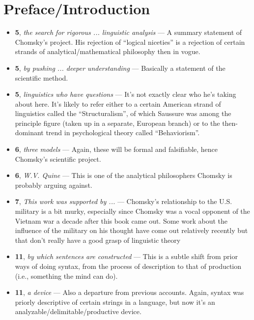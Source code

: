 \documentclass[12pt]{article}
\begin{document}
\section{Preface/Introduction}

\begin{itemize}

\item \textbf{5}, \textit{the search for rigorous ... linguistic analysis} --- A summary statement of Chomsky's project. His rejection of ``logical niceties'' is a rejection of certain strands of analytical/mathematical philosophy then in vogue.

\item \textbf{5}, \textit{by pushing ... deeper understanding} --- Basically a statement of the scientific method.

\item \textbf{5}, \textit{linguistics who have questions} --- It's not exactly clear who he's taking about here. It's likely to refer either to a certain American strand of linguistics called the ``Structuralism'', of which Saussure was among the principle figure (taken up in a separate, European branch) or to the then-dominant trend in psychological theory called ``Behaviorism''.

\item \textbf{6}, \textit{three models} --- Again, these will be formal and falsifiable, hence Chomsky's scientific project.

\item \textbf{6}, \textit{W.V. Quine} --- 
This is one of the analytical philosophers Chomsky is probably arguing against.

\item \textbf{7}, \textit{This work was supported by ...} --- Chomsky's relationship to the U.S. military is a bit murky, especially since Chomsky was a vocal opponent of the Vietnam war a decade after this book came out. Some work about the influence of the military on his thought have come out relatively recently but that don't really have a good grasp of linguistic theory

\item \textbf{11}, \textit{by which sentences are constructed} --- This is a subtle shift from prior ways of doing syntax, from the process of description to that of production (i.e., something the mind can do).

\item \textbf{11}, \textit{a device} --- Also a departure from previous accounts. Again, syntax was priorly descriptive of certain strings in a language, but now it's an analyzable/delimitable/productive device.


\end{itemize}
\end{document}
